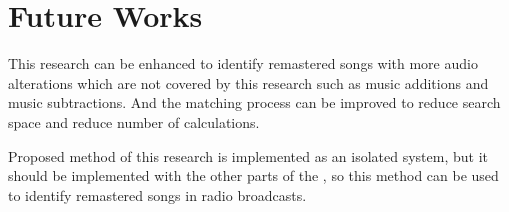 \section{Future Works}

This research can be enhanced to identify remastered songs with more
audio alterations which are not covered by this research such as music
additions and music subtractions. And the matching process can be improved
to reduce search space and reduce number of calculations.

Proposed method of this research is implemented as an isolated system, but
it should be implemented with the other parts of the \cite{Nishan}, so this method can
be used to identify remastered songs in radio broadcasts.  